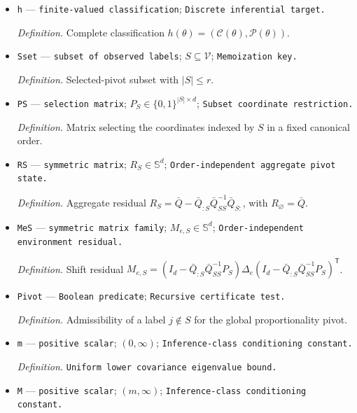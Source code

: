 \documentclass{article}
\begin{document}
\begin{itemize}
  \par\smallskip\noindent\emph{Definition.} Possible nodes \(\mathcal P(\theta)=\bigcup_{T\in\mathcal F_{\mathrm{LDL}}(\theta)}T\).
  \item \texttt{h} --- \texttt{finite-\allowbreak{}valued classification}; \texttt{Discrete inferential target.}
  \par\smallskip\noindent\emph{Definition.} Complete classification \(h(\theta)=(\mathcal C(\theta),\mathcal P(\theta))\).
  \item \texttt{Sset} --- \texttt{subset of observed labels}; \(S\subseteq\mathcal V\); \texttt{Memoization key.}
  \par\smallskip\noindent\emph{Definition.} Selected-pivot subset with \(\lvert S\rvert\le r\).
  \item \texttt{PS} --- \texttt{selection matrix}; \(P_S\in\{0,1\}^{|S|\times d}\); \texttt{Subset coordinate restriction.}
  \par\smallskip\noindent\emph{Definition.} Matrix selecting the coordinates indexed by \(S\) in a fixed canonical order.
  \item \texttt{RS} --- \texttt{symmetric matrix}; \(R_S\in\mathbb S^d\); \texttt{Order-\allowbreak{}independent aggregate pivot state.}
  \par\smallskip\noindent\emph{Definition.} Aggregate residual \(R_S=\bar Q-\bar Q_{:S}\bar Q_{SS}^{-1}\bar Q_{S:}\), with \(R_{\varnothing}=\bar Q\).
  \item \texttt{MeS} --- \texttt{symmetric matrix family}; \(M_{e,S}\in\mathbb S^d\); \texttt{Order-\allowbreak{}independent environment residual.}
  \par\smallskip\noindent\emph{Definition.} Shift residual \(M_{e,S}=(I_d-\bar Q_{:S}\bar Q_{SS}^{-1}P_S)\Delta_e(I_d-\bar Q_{:S}\bar Q_{SS}^{-1}P_S)^{\mathsf T}\).
  \item \texttt{Pivot} --- \texttt{Boolean predicate}; \texttt{Recursive certificate test.}
  \par\smallskip\noindent\emph{Definition.} Admissibility of a label \(j\notin S\) for the global proportionality pivot.
  \item \texttt{m} --- \texttt{positive scalar}; \((0,\infty)\); \texttt{Inference-\allowbreak{}class conditioning constant.}
  \par\smallskip\noindent\emph{Definition.} \texttt{Uniform lower covariance eigenvalue bound.}
  \item \texttt{M} --- \texttt{positive scalar}; \((m,\infty)\); \texttt{Inference-\allowbreak{}class conditioning constant.}

\end{itemize}
\end{document}
